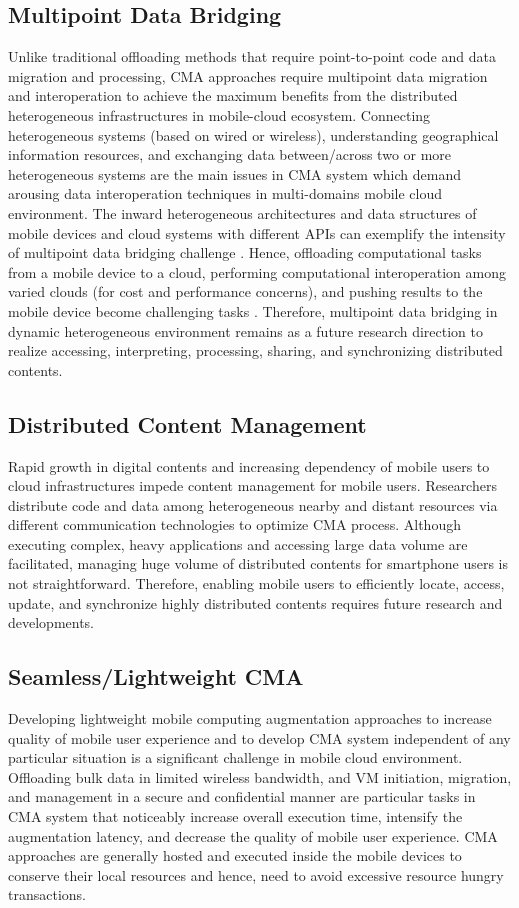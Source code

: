 \documentclass[publish]{IEEEtran}
\begin{document}
\subsection{Multipoint Data Bridging}
Unlike traditional offloading methods that require point-to-point code and data migration and processing, CMA approaches require multipoint data migration and interoperation to achieve the maximum benefits from the distributed heterogeneous infrastructures in mobile-cloud ecosystem. Connecting heterogeneous systems (based on wired or wireless), understanding geographical information resources, and exchanging data between/across two or more heterogeneous systems \cite{Blair2011} are the main issues in CMA system which demand arousing data interoperation techniques in multi-domains mobile cloud environment. The inward heterogeneous architectures and data structures of mobile devices and cloud systems with different APIs can exemplify the intensity of multipoint data bridging challenge \cite{HoganJuly2011}. Hence, offloading computational tasks from a mobile device to a cloud, performing computational interoperation among varied clouds (for cost and performance concerns), and pushing results to the mobile device become challenging tasks \cite{A.Ranabahu}. Therefore, multipoint data bridging in dynamic heterogeneous environment remains as a future research direction to realize accessing, interpreting, processing, sharing, and synchronizing distributed contents.

\subsection{Distributed Content Management}
Rapid growth in digital contents and increasing dependency of mobile users to cloud infrastructures impede content management for mobile users. Researchers distribute code and data among heterogeneous nearby and distant resources via different communication technologies to optimize CMA process. Although executing complex, heavy applications and accessing large data volume are facilitated, managing huge volume of distributed contents for smartphone users is not straightforward. Therefore, enabling mobile users to efficiently locate, access, update, and synchronize highly distributed contents requires future research and developments.

\subsection{Seamless/Lightweight CMA}
Developing lightweight mobile computing augmentation approaches to increase quality of mobile user experience and to develop CMA system independent of any particular situation is a significant challenge in mobile cloud environment. Offloading bulk data in limited wireless bandwidth, and VM initiation, migration, and management in a secure and confidential manner are particular tasks in CMA system that noticeably increase overall execution time, intensify the augmentation latency, and decrease the quality of mobile user experience. CMA approaches are generally hosted and executed inside the mobile devices to conserve their local resources and hence, need to avoid excessive resource hungry transactions.
\end{document}
